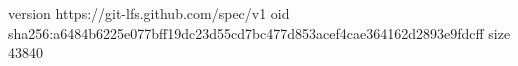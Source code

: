version https://git-lfs.github.com/spec/v1
oid sha256:a6484b6225e077bff19dc23d55cd7bc477d853acef4cae364162d2893e9fdcff
size 43840

